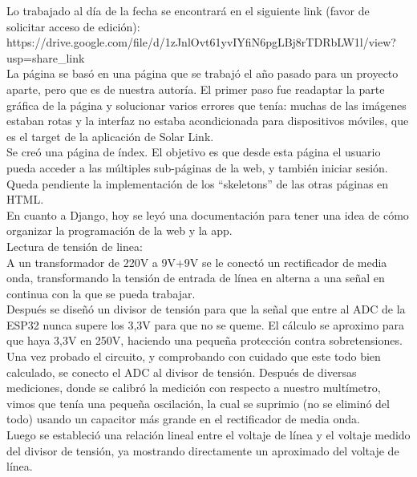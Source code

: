 Lo trabajado al día de la fecha se encontrará en el siguiente link (favor de solicitar acceso de edición):\\

https://drive.google.com/file/d/1zJnlOvt61yvIYfiN6pgLBj8rTDRbLW1l/view?usp=share\_link\\

La página se basó en una página que se trabajó el año pasado para un proyecto aparte, pero que es de nuestra autoría. El primer paso fue readaptar la parte gráfica de la página y solucionar varios errores que tenía: muchas de las imágenes estaban rotas y la interfaz no estaba acondicionada para dispositivos móviles, que es el target de la aplicación de Solar Link.\\

Se creó una página de índex. El objetivo es que desde esta página el usuario pueda acceder a las múltiples sub-páginas de la web, y también iniciar sesión. Queda pendiente la implementación de los “skeletons” de las otras páginas en HTML. \\

En cuanto a Django, hoy se leyó una documentación para tener una idea de cómo organizar la programación de la web y la app.\\

Lectura de tensión de linea:\\

A un transformador de 220V a 9V+9V se le conectó un rectificador de media onda, transformando la tensión de entrada de línea en alterna a una señal en continua con la que se pueda trabajar. \\

Después se diseñó un divisor de tensión para que la señal que entre al ADC de la ESP32 nunca supere los 3,3V para que no se queme. El cálculo se aproximo para que haya 3,3V en 250V, haciendo una pequeña protección contra sobretensiones.\\

Una vez probado el circuito, y comprobando con cuidado que este todo bien calculado, se conecto el ADC al divisor de tensión.
Después de diversas mediciones, donde se calibró la medición con respecto a nuestro multímetro, vimos que tenía una pequeña oscilación, la cual se suprimio (no se eliminó del todo) usando un capacitor más grande en el rectificador de media onda.\\

Luego se estableció una relación lineal entre el voltaje de línea y el voltaje medido del divisor de tensión, ya mostrando directamente un aproximado del voltaje de línea. \\

